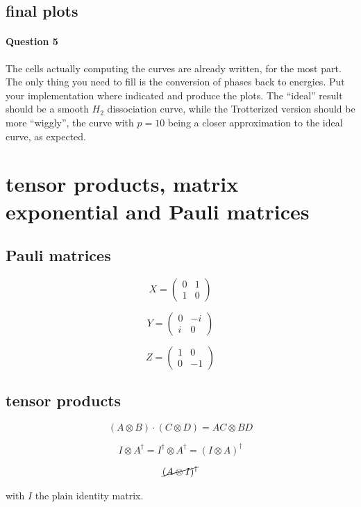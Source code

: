 \documentclass{article}
\begin{document}
\subsection{final plots}

\paragraph{Question 5} The cells actually computing the curves are already written, for the most part. The only
thing you need to fill is the conversion of phases back to energies. Put your implementation where indicated and produce the plots.
The ``ideal'' result should be a smooth $H_{2}$ dissociation curve, while the Trotterized version should be more ``wiggly'',
the curve with $p=10$ being a closer approximation to the ideal curve, as expected.

\appendix
\section{tensor products, matrix exponential and Pauli matrices}

\subsection{Pauli matrices}

$$ X = \begin{pmatrix} 0 & 1 \\ 1 & 0 \end{pmatrix} $$

$$ Y = \begin{pmatrix} 0 & -i \\ i & 0 \end{pmatrix} $$

$$ Z = \begin{pmatrix} 1 & 0 \\ 0 & -1 \end{pmatrix} $$

\subsection{tensor products}

$$ (A\otimes B)\cdot (C\otimes D) = AC\otimes BD $$

$$ I\otimes A^{\dagger} = I^{\dagger}\otimes A^{\dagger} = 
(I\otimes A)^{\dagger}   $$

$$\cancel{(A\otimes I)^{\dagger}}  $$

with $I$ the plain identity matrix.
\end{document}
